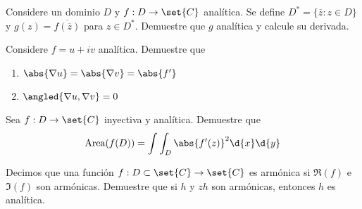 \documentclass{homework}
\begin{document}
\begin{prob}
    Considere un dominio \(D\) y \(f:D\rightarrow\set{C}\) analítica. Se define \(D^*=\{\overline{z}:z\in D\}\) y \(g(z)=\overline{f(\overline{z})}\) para \(z\in D^*\). Demuestre que \(g\) analítica y calcule su derivada.
\end{prob}

\begin{sol}

\end{sol}

\begin{prob}
    Considere \(f=u+iv\) analítica. Demuestre que
    \begin{enumerate}[label=(\alph*)]
        \item \(\abs{\nabla u}=\abs{\nabla v}=\abs{f'}\)
        \item \(\angled{\nabla u,\nabla v}=0\)
    \end{enumerate}
\end{prob}

\begin{sol}

\end{sol}

\begin{prob}
    Sea \(f:D\rightarrow\set{C}\) inyectiva y analítica. Demuestre que
    \[\text{Area}(f(D))=\int\int_D\abs{f'(z)}^2\d{x}\d{y}\]
\end{prob}

\begin{sol}

\end{sol}

\begin{prob}
    Decimos que una función \(f:D\subset\set{C}\rightarrow\set{C}\) es armónica si \(\Re(f)\) e \(\Im(f)\) son armónicas. Demuestre que si  \(h\) y \(zh\) son armónicas, entonces \(h\) es analítica.
\end{prob}
\end{document}
